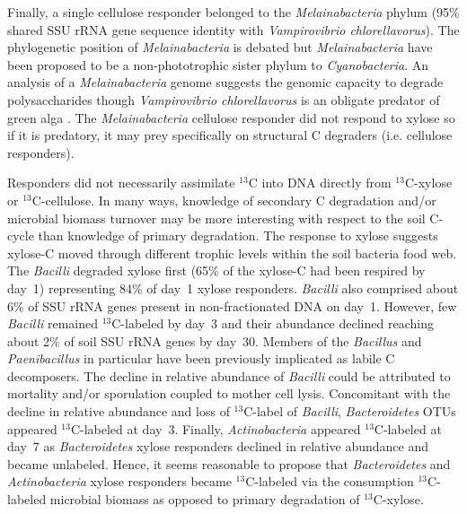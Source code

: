 Finally, a single cellulose responder belonged to the \textit{Melainabacteria}
phylum (95\% shared SSU rRNA gene sequence identity with \textit{Vampirovibrio
chlorellavorus}). The phylogenetic position of \textit{Melainabacteria} is
debated but \textit{Melainabacteria} have been proposed to be
a non-phototrophic sister phylum to \textit{Cyanobacteria}. An analysis of
a \textit{Melainabacteria} genome \citep{Di_Rienzi_2013} suggests the
genomic capacity to degrade polysaccharides though \textit{Vampirovibrio
chlorellavorus} is an obligate predator of green alga \citep{gromov_1972}. The
\textit{Melainabacteria} cellulose responder did not respond to xylose so if it
is predatory, it may prey specifically on structural C degraders (i.e.
cellulose responders).

Responders did not necessarily assimilate $^{13}$C into DNA directly
from $^{13}$C-xylose or $^{13}$C-cellulose. In many ways, knowledge of
secondary C degradation and/or microbial biomass turnover may be more
interesting with respect to the soil C-cycle than knowledge of primary
degradation. The response to xylose suggests xylose-C moved through different
trophic levels within the soil bacteria food web. The \textit{Bacilli} degraded
xylose first (65\% of the xylose-C had been respired by day~1) representing
84\% of day~1 xylose responders. \textit{Bacilli} also comprised about 6\% of
SSU rRNA genes present in non-fractionated DNA on day~1. However, few
\textit{Bacilli} remained $^{13}$C-labeled by day~3 and their abundance
declined reaching about 2\% of soil SSU rRNA genes by day~30. Members of the
\textit{Bacillus} \citep{Cleveland2007} and \textit{Paenibacillus} in
particular \citep{Verastegui_2014} have been previously implicated as labile
C decomposers. The decline in relative abundance of \textit{Bacilli} could be
attributed to mortality and/or sporulation coupled to mother cell lysis.
Concomitant with the decline in relative abundance and loss of $^{13}$C-label
of \textit{Bacilli}, \textit{Bacteroidetes} OTUs appeared $^{13}$C-labeled at
day~3. Finally, \textit{Actinobacteria} appeared $^{13}$C-labeled at day~7 as
\textit{Bacteroidetes} xylose responders declined in relative abundance and
became unlabeled. Hence, it seems reasonable to propose that
\textit{Bacteroidetes} and \textit{Actinobacteria} xylose responders became
$^{13}$C-labeled via the consumption $^{13}$C-labeled microbial biomass as
opposed to primary degradation of $^{13}$C-xylose. 

